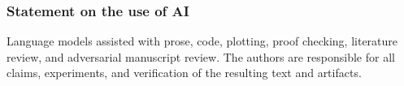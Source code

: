 \documentclass{article}
\theoremstyle{remark}
\begin{document}
\subsubsection*{Statement on the use of AI}
Language models assisted with prose, code, plotting, proof checking, literature review, and
adversarial manuscript review. The authors are responsible for all claims, experiments, and
verification of the resulting text and artifacts.

\clearpage


\clearpage
\appendix








\end{document}
